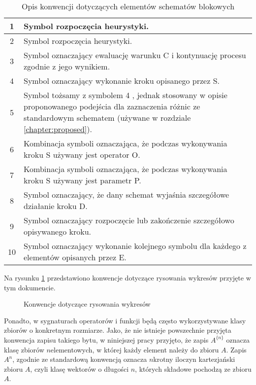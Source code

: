 \documentclass[twoside]{iisthesis}
\newcommand{\withSize}[2]{{#1}^{ \{ #2 \}}}
\newcommand{\circled}[1]{ \textcircled{\scriptsize{#1}} }
\newcommand{\graph}[1]{\centering }
\begin{document}
\begin{table}
	\caption{Opis konwencji dotyczących elementów schematów blokowych \label{table:flowchart_conventions}}
	\begin{tabularx}{\linewidth}{|c|X|}
		\hline 
		\circled{1} & Symbol rozpoczęcia heurystyki. \\
		\hline
		\circled{2} & Symbol rozpoczęcia heurystyki. \\
		\hline
		\circled{3} & Symbol oznaczający ewaluację warunku C i kontynuację procesu zgodnie z jego wynikiem. \\
		\hline
		\circled{4} & Symbol oznaczający wykonanie kroku opisanego przez S. \\
		\hline
		\circled{5} & Symbol tożsamy z symbolem \circled{4}, jednak stosowany w opisie proponowanego podejścia dla zaznaczenia różnic ze standardowym schematem (używane w rozdziale \ref{chapter:proposed}).\\
		\hline
		\circled{6} & Kombinacja symboli oznaczająca, że podczas wykonywania kroku S używany jest operator O. \\
		\hline
		\circled{7} & Kombinacja symboli oznaczająca, że podczas wykonywania kroku S używany jest parametr P. \\
		\hline
		\circled{8} & Symbol oznaczający, że dany schemat wyjaśnia szczegółowe działanie kroku D. \\
		\hline
		\circled{9} & Symbol oznaczający rozpoczęcie lub zakończenie szczegółowo opisywanego kroku. \\
		\hline
		\circled{10} & Symbol oznaczający wykonanie kolejnego symbolu dla każdego z elementów opisanych przez E. \\
		\hline
	\end{tabularx}
\end{table}

Na rysunku \ref{plot:conventions} przedstawiono konwencje dotyczące rysowania wykresów przyjęte w tym dokumencie.

\begin{figure}
	\caption{Konwencje dotyczące rysowania wykresów \label{plot:conventions}}
	\centering
	\graph{example_whiskers.tex}
\end{figure}

Ponadto, w sygnaturach operatorów i funkcji będą często wykorzystywane klasy zbiorów o konkretnym rozmiarze. Jako, że nie istnieje powszechnie przyjęta konwencja zapisu takiego bytu, w niniejszej pracy przyjęto, że zapis $\withSize{A}{n}$ oznacza klasę zbiorów $n$elementowych, w której każdy element należy do zbioru $A$. Zapis $A^n$, zgodnie ze standardową konwencją oznacza $n$krotny iloczyn kartezjański zbioru $A$, czyli klasę wektorów o długości $n$, których składowe pochodzą ze zbioru $A$.
\end{document}
